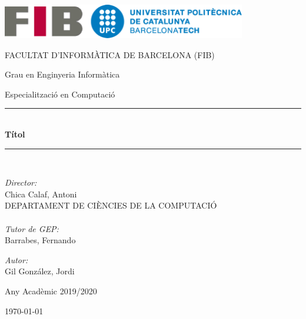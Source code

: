 \newcommand{\HRule}{\rule{\linewidth}{0.5mm}}

\thispagestyle{empty}


\begin{center}

\includegraphics[width=0.8\textwidth]{media/fib2.png}

\large FACULTAT D'INFORMÀTICA DE BARCELONA (FIB)

\large Grau en Enginyeria Informàtica

Especialització en Computació

\vspace{1cm}


\HRule \\[0.4cm]
{
 \LARGE \bfseries \sffamily Títol  \\[0.4cm] 
}
\HRule \\[0.4cm] 

\normalfont \small {}

\vspace{1.2cm} %


\noindent
\begin{minipage}[t]{0.49\textwidth}
\begin{flushleft} \large
\emph{Director:} \\
Chica Calaf, Antoni\\
\small{DEPARTAMENT DE CIÈNCIES DE LA COMPUTACIÓ} \\
\hfill \\
\large
\emph{Tutor de GEP:} \\
Barrabes, Fernando\\
\end{flushleft}
\end{minipage}
\begin{minipage}[t]{0.49\textwidth}
\begin{flushright}
\large
\emph{Autor:}\\
Gil González, Jordi\\
\end{flushright}
\end{minipage}

\vfill

\large Any Acadèmic 2019/2020

\large \today

\end{center}
